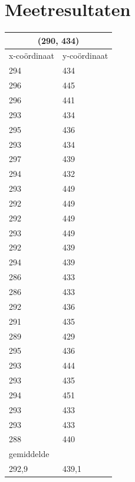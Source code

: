 \documentclass{article}
\begin{document}
\section{Meetresultaten}
\label{Meetresultaten}
\begin{tabular}{ |l|l| }
  \hline
  \multicolumn{2}{|c|}{(290, 434)} \\
  \hline
  x-co\"ordinaat & y-co\"ordinaat \\ \hline
     294 & 434\\ \hline
     296 & 445\\ \hline
     296 & 441\\ \hline
     293 & 434\\ \hline
     295 & 436\\ \hline
     293 & 434\\ \hline
     297 & 439\\ \hline
     294 & 432\\ \hline
     293 & 449\\ \hline
     292 & 449\\ \hline
     292 & 449\\ \hline
     293 & 449\\ \hline
     292 & 439\\ \hline
     294 & 439\\ \hline
     286 & 433\\ \hline
     286 & 433\\ \hline
     292 & 436\\ \hline
     291 & 435\\ \hline
     289 & 429\\ \hline
     295 & 436\\ \hline
     293 & 444\\ \hline
     293 & 435\\ \hline
     294 & 451\\ \hline
     293 & 433\\ \hline
     293 & 433\\ \hline
     288 & 440\\ \hline\hline
     \multicolumn{2}{|l|}{gemiddelde} \\ \hline
     292,9 & 439,1 \\ \hline
\end{tabular}
\end{document}

